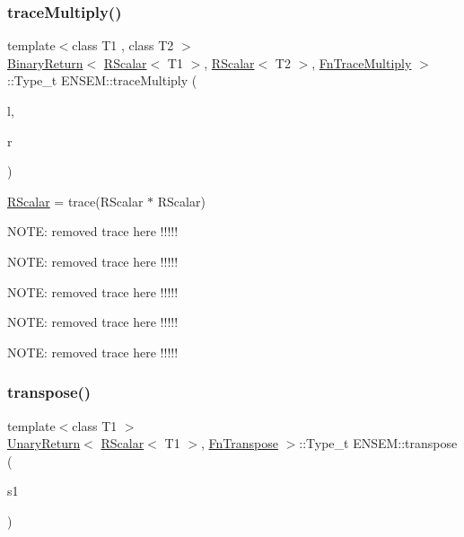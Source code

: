 \subsubsection{\texorpdfstring{traceMultiply()}{traceMultiply()}}
{\footnotesize\ttfamily template$<$class T1 , class T2 $>$ \\
\mbox{\hyperlink{structENSEM_1_1BinaryReturn}{Binary\+Return}}$<$ \mbox{\hyperlink{classENSEM_1_1RScalar}{R\+Scalar}}$<$ T1 $>$, \mbox{\hyperlink{classENSEM_1_1RScalar}{R\+Scalar}}$<$ T2 $>$, \mbox{\hyperlink{structENSEM_1_1FnTraceMultiply}{Fn\+Trace\+Multiply}} $>$\+::Type\+\_\+t E\+N\+S\+E\+M\+::trace\+Multiply (\begin{DoxyParamCaption}\item[{const \mbox{\hyperlink{classENSEM_1_1RScalar}{R\+Scalar}}$<$ T1 $>$ \&}]{l,  }\item[{const \mbox{\hyperlink{classENSEM_1_1RScalar}{R\+Scalar}}$<$ T2 $>$ \&}]{r }\end{DoxyParamCaption})\hspace{0.3cm}{\ttfamily [inline]}}



\mbox{\hyperlink{classENSEM_1_1RScalar}{R\+Scalar}} = trace(\+R\+Scalar $\ast$ R\+Scalar) 

N\+O\+TE\+: removed trace here !!!!!

N\+O\+TE\+: removed trace here !!!!!

N\+O\+TE\+: removed trace here !!!!!

N\+O\+TE\+: removed trace here !!!!!

N\+O\+TE\+: removed trace here !!!!! \mbox{\label{group__rscalar_ga0a32a83382be7e92236abd5dc654c18d}} 
\subsubsection{\texorpdfstring{transpose()}{transpose()}}
{\footnotesize\ttfamily template$<$class T1 $>$ \\
\mbox{\hyperlink{structENSEM_1_1UnaryReturn}{Unary\+Return}}$<$ \mbox{\hyperlink{classENSEM_1_1RScalar}{R\+Scalar}}$<$ T1 $>$, \mbox{\hyperlink{structENSEM_1_1FnTranspose}{Fn\+Transpose}} $>$\+::Type\+\_\+t E\+N\+S\+E\+M\+::transpose (\begin{DoxyParamCaption}\item[{const \mbox{\hyperlink{classENSEM_1_1RScalar}{R\+Scalar}}$<$ T1 $>$ \&}]{s1 }\end{DoxyParamCaption})\hspace{0.3cm}{\ttfamily [inline]}}

